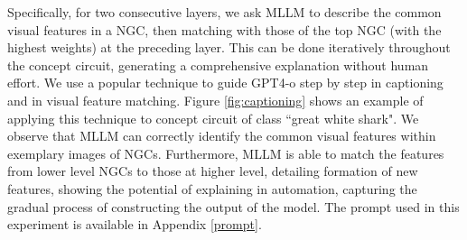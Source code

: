 Specifically, for two consecutive layers, we ask MLLM to describe the common visual features in a NGC, then matching with those of the top NGC (with the highest weights) at the preceding layer. This can be done iteratively throughout the concept circuit, generating a comprehensive explanation without human effort. We use a popular technique \citep{Chain_of_thought} to guide GPT4-o \citep{Gpt4o} step by step in captioning and in visual feature matching. Figure \ref{fig:captioning} shows an example of applying this technique to concept circuit of class ``great white shark". We observe that MLLM can correctly identify the common visual features within exemplary images of NGCs. Furthermore, MLLM is able to match the features from lower level NGCs to those at higher level, detailing formation of new features, showing the potential of explaining in automation, capturing the gradual process of constructing the output of the model. The prompt used in this experiment is available in Appendix \ref{prompt}.
